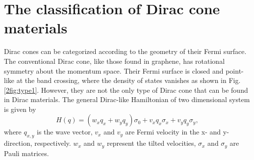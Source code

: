 \section{The classification of Dirac cone materials} \label{2sec: Dirac cone class}
    Dirac cones can be categorized according to the geometry of their Fermi surface.
    The conventional Dirac cone, like those found in graphene, has rotational symmetry about the momentum space. 
    Their Fermi surface is closed and point-like at the band crossing, where the density of states vanishes as shown in Fig. \ref{2fig:type1}.
    However, they are not the only type of Dirac cone that can be found in Dirac materials.
    The general Dirac-like Hamiltonian of two dimensional system is given by
    \begin{equation} \label{2eq:Hamiltonian in dirac cone class}
        H(q) = (w_{x}q_x+w_{y}q_y)\sigma_0 + v_x q_x \sigma_x + v_y q_y \sigma_y,
    \end{equation}
    where $q_{x,y}$ is the wave vector, $v_{x}$ and $v_{y}$ are Fermi velocity in the x- and y-direction, respectively. 
    $w_{x}$ and $w_{y}$ represent the tilted velocities, $\sigma_x$ and $\sigma_y$ are Pauli matrices.
